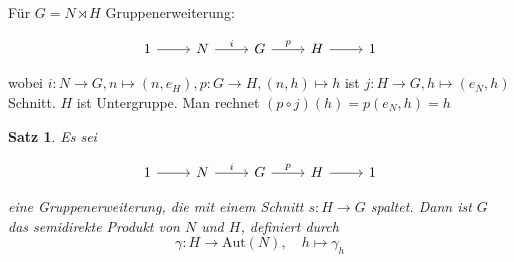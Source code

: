 \documentclass[12pt]{scrartcl}%
\newtheorem{thm}{Satz}
\theoremstyle{definition}
\theoremstyle{remark}
\begin{document}
Für $G=N\rtimes H$ Gruppenerweiterung:

\[ \begin{tikzcd}
        1 \arrow[r] & N \arrow[r,"i"] & G \arrow[r,"p"] & H \arrow[r] & 1
\end{tikzcd} \]

wobei $i: N\to G, n\mapsto (n,e_H), p:G\to H, (n,h)\mapsto h$ ist $j:H\to G, h\mapsto (e_N,h)$ Schnitt. $H$ ist Untergruppe. Man rechnet $(p\circ j)(h)=p(e_N,h)=h$

\begin{thm}
    Es sei

    \[ \begin{tikzcd}
        1 \arrow[r] & N \arrow[r,"i"] & G \arrow[r,"p"] & H \arrow[r] & 1
    \end{tikzcd} \]

    eine Gruppenerweiterung, die mit einem Schnitt $s:H\to G$ spaltet. Dann ist $G$ das semidirekte Produkt von $N$ und $H$, definiert durch $$\gamma: H\to \text{Aut}(N), \quad h\mapsto \gamma_h$$
\end{thm}
\end{document}
